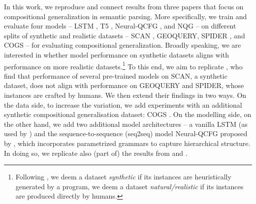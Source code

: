 In this work, we reproduce and connect results from three papers \citep{shaw-etal-2021-compositional, kim2021sequencetosequence, kim-linzen-2020-cogs} that focus on compositional generalization in semantic parsing.
More specifically, we train and evaluate four models -- LSTM \cite{hochreiter1997long}, T5 \cite{raffel2020exploring}, Neural-QCFG \cite{kim2021sequencetosequence}, and NQG \cite{shaw-etal-2021-compositional} -- on different splits of synthetic and realistic datasets -- SCAN \cite{Lake2018GeneralizationWS}, GEOQUERY, SPIDER \cite{yu2018spider}, and COGS \cite{kim-linzen-2020-cogs} -- for evaluating compositional generalization.
Broadly speaking, we are interested in whether model performance on synthetic datasets aligns with performance on more realistic datasets.\footnote{Following \cite{shaw-etal-2021-compositional}, we deem a dataset \textit{synthetic} if its instances are heuristically generated by a program, we deem a dataset \textit{natural/realistic} if its instances are produced directly by humans.}
To this end, we aim to replicate \cite{shaw-etal-2021-compositional}, who find that performance of several pre-trained models on SCAN, a synthetic dataset, does not align with performance on GEOQUERY and SPIDER, whose instances are crafted by humans.
We then extend their findings in two ways.
On the data side, to increase the variation, we add experiments with an additional synthetic compositional generalisation dataset: COGS \cite{kim-linzen-2020-cogs}.
On the modelling side, on the other hand, we add two additional model architectures -- a vanilla LSTM (as used by \cite{kim-linzen-2020-cogs}) and the sequence-to-sequence (seq2seq) model Neural-QCFG proposed by \cite{kim2021sequencetosequence}, which incorporates parametrized grammars to capture hierarchical structure.
In doing so, we replicate also (part of) the results from \cite{kim2021sequencetosequence} and \cite{kim-linzen-2020-cogs}.


